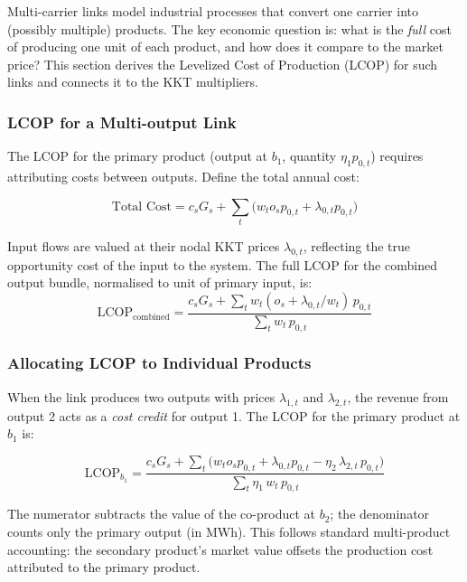 \documentclass{article}
\begin{document}
Multi-carrier links model industrial processes that convert one carrier
into (possibly multiple) products. The key economic question is: what is
the \emph{full} cost of producing one unit of each product, and how does it
compare to the market price? This section derives the Levelized Cost of
Production (LCOP) for such links and connects it to the KKT multipliers.

\subsubsection{LCOP for a Multi-output Link}

The LCOP for the primary product (output at $b_1$, quantity $\eta_1 p_{0,t}$)
requires attributing costs between outputs. Define the total annual cost:

\begin{equation}
    \text{Total Cost} = c_s G_s + \sum_t \bigl(w_t o_s p_{0,t}
    + \lambda_{0,t} p_{0,t}\bigr)
    \label{eq:total_cost}
\end{equation}

Input flows are valued at their nodal KKT prices $\lambda_{0,t}$, reflecting
the true opportunity cost of the input to the system.
The full LCOP for the combined output bundle, normalised to unit of primary
input, is:
\begin{equation}
    \text{LCOP}_{\text{combined}} =
    \frac{c_s G_s + \displaystyle\sum_t w_t (o_s + \lambda_{0,t}/w_t)\, p_{0,t}}
         {\displaystyle\sum_t w_t\, p_{0,t}}
    \label{eq:lcop_combined}
\end{equation}

\subsubsection{Allocating LCOP to Individual Products}

When the link produces two outputs with prices $\lambda_{1,t}$ and
$\lambda_{2,t}$, the revenue from output 2 acts as a \emph{cost credit}
for output 1. The LCOP for the primary product at $b_1$ is:

\begin{equation}
    \text{LCOP}_{b_1} =
    \frac{c_s G_s
        + \displaystyle\sum_t \bigl(w_t o_s p_{0,t}
        + \lambda_{0,t} p_{0,t}
        - \eta_2\, \lambda_{2,t}\, p_{0,t}\bigr)}
         {\displaystyle\sum_t \eta_1\, w_t\, p_{0,t}}
    \label{eq:lcop_b1}
\end{equation}

The numerator subtracts the value of the co-product at $b_2$; the denominator
counts only the primary output (in MWh). This follows standard multi-product
accounting: the secondary product's market value offsets the production cost
attributed to the primary product.
\end{document}
